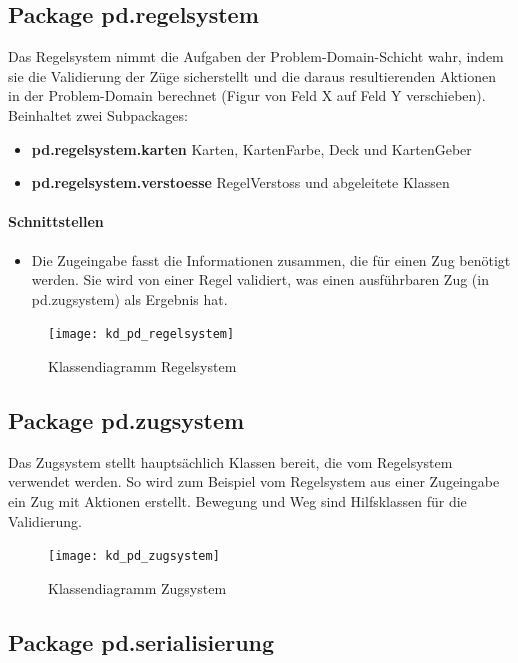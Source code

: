 \documentclass[12pt,halfparskip]{scrartcl}
\begin{document}
\clearpage
\subsection{Package pd.regelsystem}

Das Regelsystem nimmt die Aufgaben der Problem-Domain-Schicht wahr, indem sie die Validierung der Züge sicherstellt und die daraus resultierenden Aktionen in der Problem-Domain berechnet (Figur von Feld X auf Feld Y verschieben). Beinhaltet zwei Subpackages:

\begin{itemize}
	\item \textbf{pd.regelsystem.karten} Karten, KartenFarbe, Deck und KartenGeber
	\item \textbf{pd.regelsystem.verstoesse} RegelVerstoss und abgeleitete Klassen
\end{itemize}

\paragraph{Schnittstellen}
\begin{itemize}
	\item Die Zugeingabe fasst die Informationen zusammen, die für einen Zug benötigt werden. Sie wird von einer Regel validiert, was einen ausführbaren Zug (in pd.zugsystem) als Ergebnis hat.
\end{itemize}

\begin{figure}[H]
	\centering
	\texttt{[image: kd\_pd\_regelsystem]}
	\caption{Klassendiagramm Regelsystem}
	\label{fig:kd_pd_regelsystem}
\end{figure}

\clearpage
\subsection{Package pd.zugsystem}

Das Zugsystem stellt hauptsächlich Klassen bereit, die vom Regelsystem verwendet werden. So wird zum Beispiel vom Regelsystem aus einer Zugeingabe ein Zug mit Aktionen erstellt. Bewegung und Weg sind Hilfsklassen für die Validierung.

\begin{figure}[H]
	\centering
	\texttt{[image: kd\_pd\_zugsystem]}
	\caption{Klassendiagramm Zugsystem}
	\label{fig:kd_pd_zugsystem}
\end{figure}

\clearpage
\subsection{Package pd.serialisierung}
\end{document}
